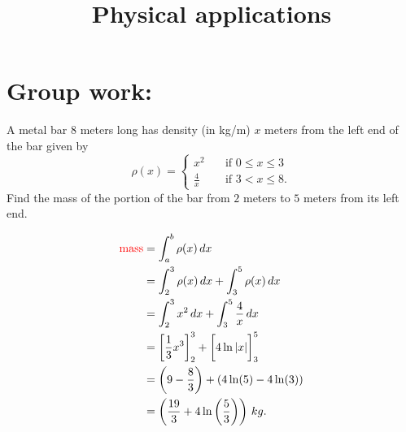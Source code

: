 \documentclass[]{ximera}
\title{Physical applications}
\begin{document}
\begin{abstract}		\end{abstract}
\maketitle

\section{Group work:}



\begin{problem}
A metal bar $8$ meters long has density (in kg/m) $x$ meters from the left end of the bar given by
	\begin{equation*}
	\rho(x) = \left\{ \begin{array}{rl} x^2 & \quad \text{if } 0 \leq x \leq 3 \\ \frac{4}{x} & \quad \text{if } 3 < x \leq 8. \end{array} \right.  
	\end{equation*}
Find the mass of the portion of the bar from $2$ meters to $5$ meters from its left end.
	
	\begin{freeResponse}
		\begin{align*}
		\text{{\color{red} mass}} &= \int_a^b \rho(x) \,d x  \\
		&= \int_2^3 \rho(x) \,d x + \int_3^5 \rho(x) \,d x  \\
		&= \int_2^3 x^2 \,d x + \int_3^5 \frac{4}{x} \,d x  \\
		&= \bigg[ \frac{1}{3} x^3 \bigg]_2^3 + \bigg[ 4 \ln|x| \bigg]_3^5  \\
		&= \left( 9 - \frac{8}{3} \right) + \left(4 \ln (5) - 4 \ln (3) \right)  \\
		&= \left( \frac{19}{3} + 4 \ln \left( \frac{5}{3} \right) \right) \, kg.
		\end{align*}
	\end{freeResponse}
	
\end{problem}
\end{document}
